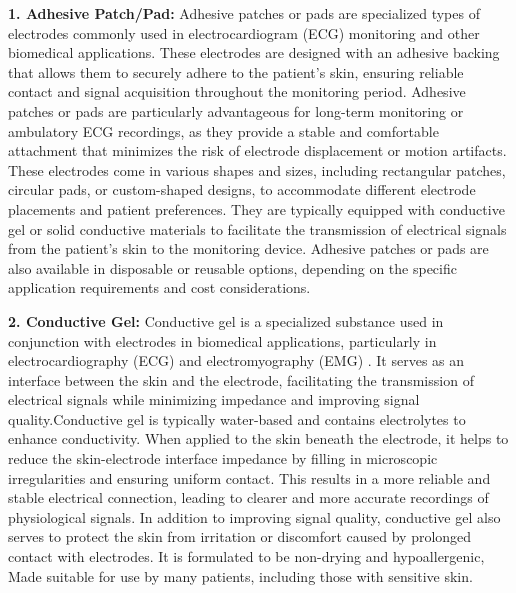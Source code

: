 \textbf{1. Adhesive Patch/Pad:}
    Adhesive patches or pads are specialized types of electrodes commonly used in electrocardiogram (ECG) monitoring and other biomedical applications. These electrodes are designed with an adhesive backing that allows them to securely adhere to the patient's skin, ensuring reliable contact and signal acquisition throughout the monitoring period. Adhesive patches or pads are particularly advantageous for long-term monitoring or ambulatory ECG recordings, as they provide a stable and comfortable attachment that minimizes the risk of electrode displacement or motion artifacts.
    These electrodes come in various shapes and sizes, including rectangular patches, circular pads, or custom-shaped designs, to accommodate different electrode placements and patient preferences. They are typically equipped with conductive gel or solid conductive materials to facilitate the transmission of electrical signals from the patient's skin to the monitoring device. Adhesive patches or pads are also available in disposable or reusable options, depending on the specific application requirements and cost considerations.

\textbf{2. Conductive Gel:}
    Conductive gel is a specialized substance used in conjunction with electrodes in biomedical applications, particularly in electrocardiography (ECG) and electromyography (EMG) \cite{merletti2020tutorial}. It serves as an interface between the skin and the electrode, facilitating the transmission of electrical signals while minimizing impedance and improving signal quality.Conductive gel is typically water-based and contains electrolytes to enhance conductivity. When applied to the skin beneath the electrode, it helps to reduce the skin-electrode interface impedance by filling in microscopic irregularities and ensuring uniform contact. This results in a more reliable and stable electrical connection, leading to clearer and more accurate recordings of physiological signals.
    In addition to improving signal quality, conductive gel also serves to protect the skin from irritation or discomfort caused by prolonged contact with electrodes. It is formulated to be non-drying and hypoallergenic, Made suitable for use by many patients, including those with sensitive skin.

